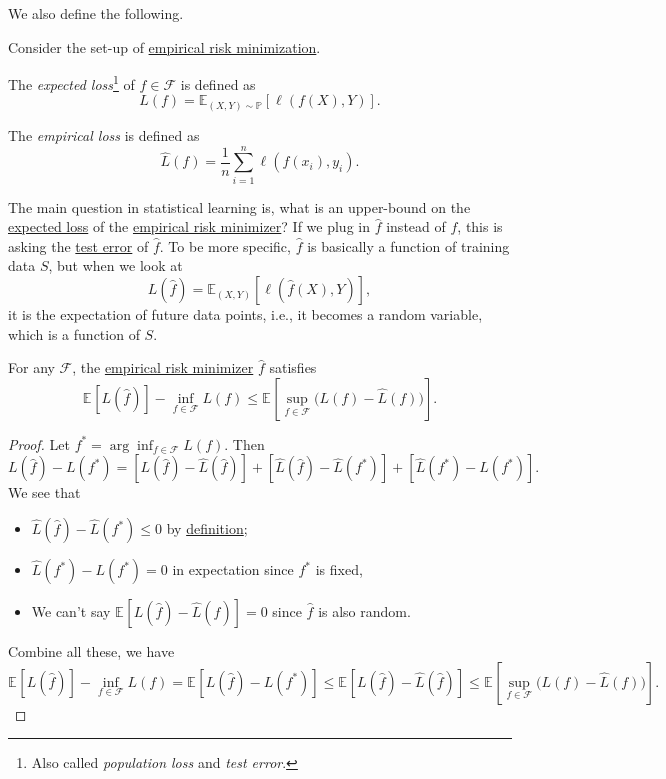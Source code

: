 We also define the following.

\begin{definition*}
	Consider the set-up of \hyperref[prb:ERM]{empirical risk minimization}.
	\begin{definition}\label{def:expected-loss}
		The \emph{expected loss}\footnote{Also called \emph{population loss} and \emph{test error}.} of \(f\in \mathscr{F} \) is defined as
		\[
			L(f) = \mathbb{E}_{(X, Y) \sim \mathbb{P} }\left[\ell (f(X), Y) \right].
		\]
	\end{definition}

	\begin{definition}\label{def:empirical-loss}
		The \emph{empirical loss} is defined as
		\[
			\hat{L} (f) = \frac{1}{n}\sum_{i=1}^{n} \ell (f(x_i), y_i).
		\]
	\end{definition}
\end{definition*}

The main question in statistical learning is, what is an upper-bound on the \hyperref[def:expected-loss]{expected loss} of the \hyperref[prb:ERM]{empirical risk minimizer}? If we plug in \(\hat{f} \) instead of \(f\), this is asking the \hyperref[def:expected-loss]{test error} of \(\hat{f} \). To be more specific, \(\hat{f} \) is basically a function of training data \(S\), but when we look at
\[
	L(\hat{f} ) = \mathbb{E}_{(X, Y)}\left[\ell (\hat{f} (X), Y) \right],
\]
it is the expectation of future data points, i.e., it becomes a random variable, which is a function of \(S\).

\begin{lemma}\label{lma:ERM}
	For any \(\mathscr{F} \), the \hyperref[prb:ERM]{empirical risk minimizer} \(\hat{f} \) satisfies
	\[
		\mathbb{E}_{}[L(\hat{f} ) ] - \inf _{f\in \mathscr{F} } L(f)
		\leq \mathbb{E}_{}\left[\sup _{f\in \mathscr{F} } \big(L(f) - \hat{L} (f) \big) \right] .
	\]
\end{lemma}
\begin{proof}
	Let \(f^{\ast} = \arg \inf _{f\in \mathscr{F} } L(f)\). Then
	\[
		L(\hat{f} ) - L(f^{\ast} )
		= [L(\hat{f} ) - \hat{L} (\hat{f} )] + [\hat{L} (\hat{f} ) - \hat{L} (f^{\ast} )] + [\hat{L} (f^{\ast} ) - L(f^{\ast} )].
	\]
	We see that
	\begin{itemize}
		\item \(\hat{L} (\hat{f} ) - \hat{L} (f^{\ast} ) \leq 0\) by \hyperref[prb:ERM]{definition};
		\item \(\hat{L} (f^{\ast} ) - L(f^{\ast} ) = 0\) in expectation since \(f^{\ast} \) is fixed,
		\item We can't say \(\mathbb{E}_{}[L(\hat{f} ) - \hat{L} (\hat{f} ) ] = 0\) since \(\hat{f} \) is also random.
	\end{itemize}
	Combine all these, we have
	\[
		\mathbb{E}_{}[L(\hat{f} ) ] - \inf _{f\in \mathscr{F} } L(f)
		= \mathbb{E}_{}[ L(\hat{f} ) - L(f^{\ast} ) ]
		\leq \mathbb{E}_{}[ L(\hat{f} ) - \hat{L} (\hat{f} ) ]
		\leq \mathbb{E}_{}\left[ \sup _{f\in \mathscr{F} } \big(L(f) - \hat{L} (f) \big) \right].
	\]
\end{proof}

